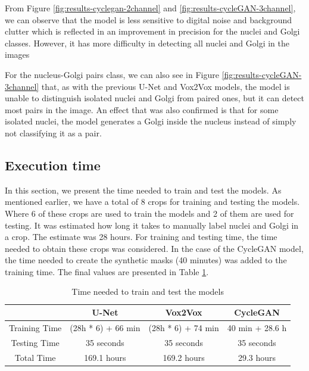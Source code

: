 From Figure \ref{fig:results-cyclegan-2channel} and \ref{fig:results-cycleGAN-3channel}, we can observe that the model is less sensitive to digital noise and background clutter which is reflected in an improvement in precision for the nuclei and Golgi classes. However, it has more difficulty in detecting all nuclei and Golgi in the images 

For the nucleus-Golgi pairs class, we can also see in Figure \ref{fig:results-cycleGAN-3channel} that, as with the previous U-Net and Vox2Vox models, the model is unable to distinguish isolated nuclei and Golgi from paired ones, but it can detect most pairs in the image. An effect that was also confirmed is that for some isolated nuclei, the model generates a Golgi inside the nucleus instead of simply not classifying it as a pair.

\subsection{Execution time}
\label{subsection:execution-time}

In this section, we present the time needed to train and test the models. As mentioned earlier, we have a total of 8 crops for training and testing the models. Where 6 of these crops are used to train the models and 2 of them are used for testing. It was estimated how long it takes to manually label nuclei and Golgi in a crop. The estimate was 28 hours. For training and testing time, the time needed to obtain these crops was considered. In the case of the CycleGAN model, the time needed to create the synthetic masks (40 minutes) was added to the training time. The final values are presented in Table \ref{tab:time}.

\begin{table}[!htb]
\centering
\caption{Time needed to train and test the models}
\label{tab:time}
\renewcommand\arraystretch{1.4}
\begin{tabular}{c|c|c|c|}
\cline{2-4}
                                    & U-Net                  & Vox2Vox                & CycleGAN               \\ \hline
\multicolumn{1}{|c|}{Training Time} & (28h * 6) + 66 min     & (28h * 6) + 74 min     & 40 min + 28.6 h        \\ \hline
\multicolumn{1}{|c|}{Testing Time}  & 35 seconds & 35 seconds & 35 seconds \\ \hline
\multicolumn{1}{|c|}{Total Time}    & 169.1 hours            & 169.2 hours           & 29.3 hours             \\ \hline
\end{tabular}
\end{table}


